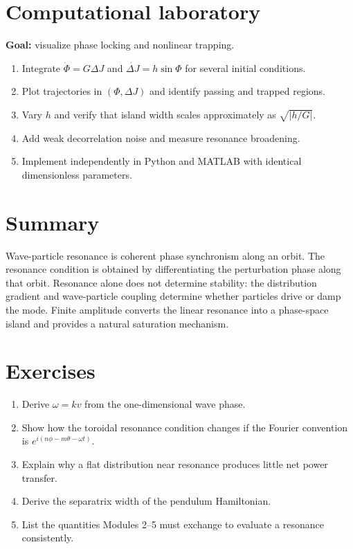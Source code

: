 \documentclass[11pt]{article}
\begin{document}
\section{Computational laboratory}
\textbf{Goal:} visualize phase locking and nonlinear trapping.
\begin{enumerate}[leftmargin=1.6em]
\item Integrate $\dot\Phi=G\Delta J$ and $\dot{\Delta J}=h\sin\Phi$ for several initial conditions.
\item Plot trajectories in $(\Phi,\Delta J)$ and identify passing and trapped regions.
\item Vary $h$ and verify that island width scales approximately as $\sqrt{|h/G|}$.
\item Add weak decorrelation noise and measure resonance broadening.
\item Implement independently in Python and MATLAB with identical dimensionless parameters.
\end{enumerate}

\section{Summary}
Wave-particle resonance is coherent phase synchronism along an orbit. The resonance condition is obtained by differentiating the perturbation phase along that orbit. Resonance alone does not determine stability: the distribution gradient and wave-particle coupling determine whether particles drive or damp the mode. Finite amplitude converts the linear resonance into a phase-space island and provides a natural saturation mechanism.

\section{Exercises}
\begin{enumerate}[leftmargin=1.6em]
\item Derive $\omega=kv$ from the one-dimensional wave phase.
\item Show how the toroidal resonance condition changes if the Fourier convention is $e^{i(n\phi-m\theta-\omega t)}$.
\item Explain why a flat distribution near resonance produces little net power transfer.
\item Derive the separatrix width of the pendulum Hamiltonian.
\item List the quantities Modules 2--5 must exchange to evaluate a resonance consistently.
\end{enumerate}
\end{document}
